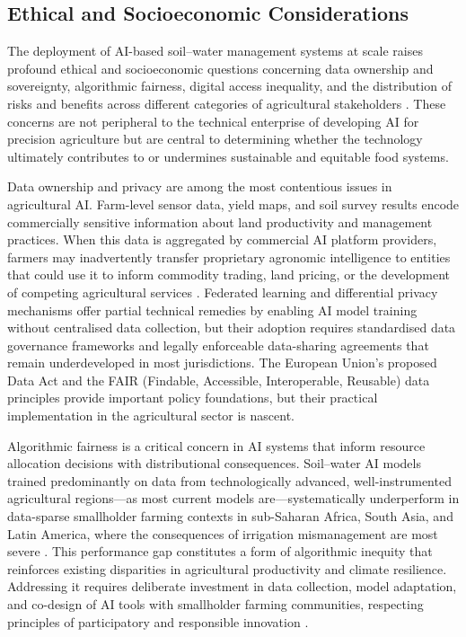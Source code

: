 \documentclass[land,article,submit,pdftex,moreauthors]{Definitions/mdpi}
\numberwithin{equation}{section}
\begin{document}
\subsection{Ethical and Socioeconomic Considerations}

The deployment of AI-based soil--water management systems at scale raises profound ethical and socioeconomic questions concerning data ownership and sovereignty, algorithmic fairness, digital access inequality, and the distribution of risks and benefits across different categories of agricultural stakeholders \citep{janssen2020responsible, shepherd2022ethics}. These concerns are not peripheral to the technical enterprise of developing AI for precision agriculture but are central to determining whether the technology ultimately contributes to or undermines sustainable and equitable food systems.

Data ownership and privacy are among the most contentious issues in agricultural AI. Farm-level sensor data, yield maps, and soil survey results encode commercially sensitive information about land productivity and management practices. When this data is aggregated by commercial AI platform providers, farmers may inadvertently transfer proprietary agronomic intelligence to entities that could use it to inform commodity trading, land pricing, or the development of competing agricultural services \citep{wolf2019datafarm}. Federated learning and differential privacy mechanisms \citep{dwork2014algorithmic} offer partial technical remedies by enabling AI model training without centralised data collection, but their adoption requires standardised data governance frameworks and legally enforceable data-sharing agreements that remain underdeveloped in most jurisdictions. The European Union's proposed Data Act and the FAIR (Findable, Accessible, Interoperable, Reusable) data principles \citep{wilkinson2016fair} provide important policy foundations, but their practical implementation in the agricultural sector is nascent.

Algorithmic fairness is a critical concern in AI systems that inform resource allocation decisions with distributional consequences. Soil--water AI models trained predominantly on data from technologically advanced, well-instrumented agricultural regions---as most current models are---systematically underperform in data-sparse smallholder farming contexts in sub-Saharan Africa, South Asia, and Latin America, where the consequences of irrigation mismanagement are most severe \citep{mwangangi2023ai}. This performance gap constitutes a form of algorithmic inequity that reinforces existing disparities in agricultural productivity and climate resilience. Addressing it requires deliberate investment in data collection, model adaptation, and co-design of AI tools with smallholder farming communities, respecting principles of participatory and responsible innovation \citep{janssen2020responsible}.
\end{document}
